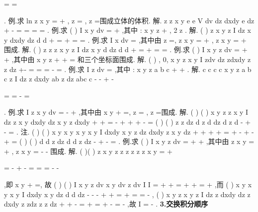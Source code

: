 =
=






\int \int \int 
\int \int \int 
\int \int \int 
. 
\textcolor{lyred}{例}.求
ln
z
x
y
=
+
,
z =
,
z =围成立体的体积. 
解.
z
z
x
y
e
e
V
dv
dz
dxdy
e dz
\pi 
\pi 
\Omega 
+
\le 
-
=
\cdots 
=
\cdots 
=
=
\int \int \int 
\int 
\int \int 
\int 
. 
\textcolor{lyred}{例}.求
(
)
I
x
y
dv
\Omega 
=
+
\int \int \int 
,其中
:
x
y
z
\Omega 
+
\le 
, 2
z
\le 
\le . 
解.
(
)
z
x
y
z
I
dz
x
y
dxdy
dz
d
d
\pi 
\theta 
\rho 
\rho \rho 
\pi 
+
\le 
=
+
=
\cdots 
=
\int 
\int \int 
\int 
\int 
\int 
. 
\textcolor{lyred}{例}.求
I
x dv
\Omega 
=\int \int \int 
,其中\Omega 由
z =,
z
x
y
=
+
,
z
x
y
=
+
围成. 
解.
(
)
z
z
z
x
y
z
I
dz
x
y
d
dz
d
d
\pi 
\sigma 
\theta 
\rho 
\rho \rho 
\pi 
\le 
+
\le 
=
+
=
\cdots 
=
\int 
\int \int 
\int 
\int 
\int 
. 
\textcolor{lyred}{例}.求
(
)
I
x
y
z dv
\Omega 
=
+
+
\int \int \int 
,其中\Omega 由
x
y
z
+
+
=
和三个坐标面围成. 
解.
(
)
,
0,
x y
z x
y
I
zdv
dz
zdxdy
z
z
dz
\Omega 
+\le -
\ge 
\ge 
=
=
=
\cdots 
-
=
\int \int \int 
\int 
\int \int 
\int 
. 
\textcolor{lyred}{例}.求
I
z dv
\Omega 
=\int \int \int 
,其中
:
x
y
z
a
b
c
\Omega 
+
+
\le . 
解.
c
c
c
c
x
y
z
a
b
c
z
I
dz
z dxdy
ab
z dz
abc
c
\pi 
\pi 
-
-
+
\le -


=
=
-
=




\int 
\int \int 
\int 
. 
\textcolor{lyred}{例}.求
I
z
x
y
dv
\Omega 
=
-
+
\int \int \int 
,其中\Omega 由
x
y
+
=,
z =
,
z =围成. 
解.
(
)
(
)
x
y
z
z
x
y
I
dz
z
x
y
dxdy
dz
x
y
z dxdy
+
\le 
\le 
+
\le 
=
-
+
+
+
-
=
\int 
\int \int 
\int 
\int \int 
(
)
(
)
z
z
dz
d
z
d
dz
d
z
d
\pi 
\pi 
\pi 
\theta 
\rho \rho \rho 
\theta 
\rho 
\rho \rho 
-
+
-
=
\int 
\int 
\int 
\int 
\int 
\int 
. 
\textcolor{lyred}{注}.
(
)
(
)
x
y
x
y
x
y
x
y
I
dxdy
x
y
z dz
dxdy
z
x
y
dz
+
+
\le 
+
\le 
+
=
+
-
+
-
+
=
\int \int 
\int 
\int \int 
\int 
(
)
(
)
d
d
z dz
d
d
z
dz
\rho 
\pi 
\pi 
\rho 
\pi 
\theta \rho \rho 
\rho 
\theta \rho \rho 
\rho 
-
+
-
=
\int 
\int 
\int 
\int 
\int 
\int 
. 
\textcolor{lyred}{例}.求
(
)
I
x
y
z
dv
\Omega 
=
+
+
\int \int \int 
,其中\Omega 由
z
x
y
=
+
,
z
x
y
=
-
-
围成. 
解.
(
)(
)
z
x
y
z
z
z
z
z
z
x
y
=
+

\Rightarrow 
=
-
\Rightarrow 
+
-
=
\Rightarrow 
=
=
-
-

,即
x
y
+
=, 
故
(
)
(
)
I
x
y
z
dv
x
y
dv
z dv
I
I
\Omega 
\Omega 
\Omega 
=
+
+
=
+
+
=
+
\int \int \int 
\int \int \int 
\int \int \int 
,而 
(
)
x
y
x
y
x
y
I
dxdy
x
y
dz
d
d
dz
\rho 
\pi 
\rho 
\theta \rho \rho 
\rho 
\pi 
\pi 
-
-
-
+
\le 
+
=
+
=
=
-
\int \int 
\int 
\int 
\int 
\int 
, 
(
)
x
y
z
x
y
z
I
dz
z dxdy
dz
z dxdy
z
zdz
z
z
dz
\pi 
\pi 
+
\le 
+
\le -
=
+
=
\cdots 
+
\cdots 
-
=
\int 
\int \int 
\int 
\int \int 
\int 
\int 
\pi 
\pi 
-
,故
I
\pi 
\pi 
=
-
. 
{\bfseries \textcolor{lyred}{3.交换积分顺序}}


